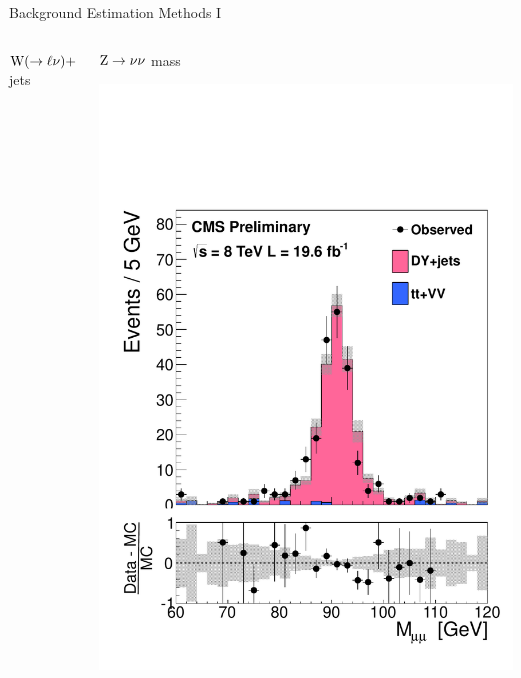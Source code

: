 \documentclass[8pt]{beamer}
\newcommand{\W}{{\rm W}}
\newcommand{\Z}{{\rm Z}}
\begin{document}
\begin{frame}{Background Estimation Methods I}
\begin{columns}
\begin{block}{$\W (\rightarrow \ell \nu)+$jets}
\end{block} 
 
\begin{block}{$\Z \rightarrow \nu \nu$ mass}

\includegraphics[width=\linewidth]{img/ZCtrlZMass}

\end{block}

\end{columns}
 
\end{frame}
\end{document}
